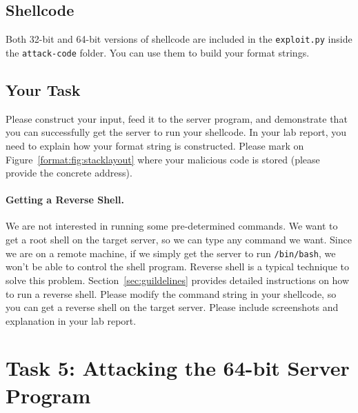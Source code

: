 \subsection{Shellcode} 



Both 32-bit and 64-bit versions of shellcode are included in 
the \texttt{exploit.py} inside the \texttt{attack-code} folder. 
You can use them to build your format strings. 


\subsection{Your Task} 

Please construct your input, feed it to the server program, and demonstrate that you can
successfully get the server to run your shellcode. 
In your lab report, you need to explain
how your format string is constructed. Please mark on Figure~\ref{format:fig:stacklayout} where 
your malicious code is stored (please provide the concrete address). 


\paragraph{Getting a Reverse Shell.}
We are not interested in running some pre-determined commands. We
want to get a root shell on the target server, so we can
type any command we want. Since we are on a remote machine,
if we simply get the server to run \texttt{/bin/bash}, we won't be able to
control the shell program. Reverse shell is a typical
technique to solve this problem. Section~\ref{sec:guildelines} provides
detailed instructions on how to run a reverse shell.
Please modify the command string in your shellcode, so you can
get a reverse shell on the target server.
Please include screenshots and explanation in your lab report.



\section{Task 5: Attacking the 64-bit Server Program}

